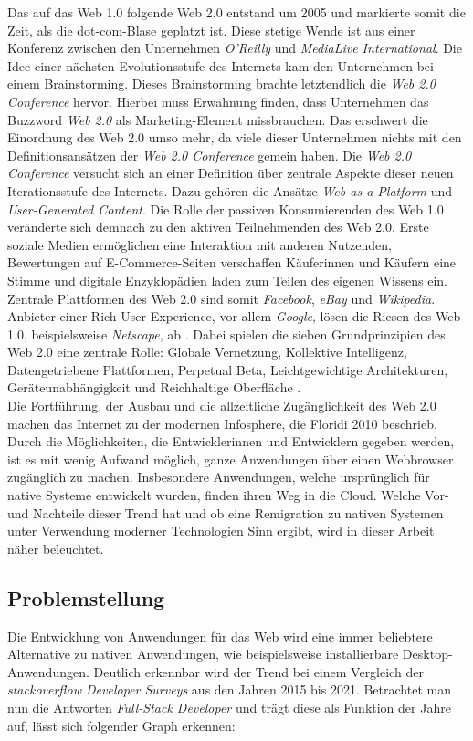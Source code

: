 \documentclass[a4paper]{scrartcl}
\begin{document}
Das auf das Web 1.0 folgende Web 2.0 entstand um 2005 und markierte somit die Zeit, als die dot-com-Blase geplatzt ist. Diese stetige Wende ist aus einer Konferenz zwischen den Unternehmen \textit{O'Reilly} und \textit{MediaLive International}. Die Idee einer nächsten Evolutionsstufe des Internets kam den Unternehmen bei einem Brainstorming. Dieses Brainstorming brachte letztendlich die \textit{Web 2.0 Conference} hervor. Hierbei muss Erwähnung finden, dass Unternehmen das Buzzword \textit{Web 2.0} als Marketing-Element missbrauchen. Das erschwert die Einordnung des Web 2.0 umso mehr, da viele dieser Unternehmen nichts mit den Definitionsansätzen der \textit{Web 2.0 Conference} gemein haben. Die \textit{Web 2.0 Conference} versucht sich an einer Definition über zentrale Aspekte dieser neuen Iterationsstufe des Internets. Dazu gehören die Ansätze \textit{Web as a Platform} und \textit{User-Generated Content}. Die Rolle der passiven Konsumierenden des Web 1.0 veränderte sich demnach zu den aktiven Teilnehmenden des Web 2.0. Erste soziale Medien ermöglichen eine Interaktion mit anderen Nutzenden, Bewertungen auf E-Commerce-Seiten verschaffen Käuferinnen und Käufern eine Stimme und digitale Enzyklopädien laden zum Teilen des eigenen Wissens ein. Zentrale Plattformen des Web 2.0 sind somit \textit{Facebook}, \textit{eBay} und \textit{Wikipedia}. Anbieter einer Rich User Experience, vor allem \textit{Google}, lösen die Riesen des Web 1.0, beispielsweise \textit{Netscape}, ab \autocite{Oreilly}. Dabei spielen die sieben Grundprinzipien des Web 2.0 eine zentrale Rolle: Globale Vernetzung, Kollektive Intelligenz, Datengetriebene Plattformen, Perpetual Beta, Leichtgewichtige Architekturen, Geräteunabhängigkeit und Reichhaltige Oberfläche \autocite[Kollmann und Häsel 2007, zitiert nach][137]{Kollmann}. \\

Die Fortführung, der Ausbau und die allzeitliche Zugänglichkeit des Web 2.0 machen das Internet zu der modernen Infosphere, die Floridi 2010 beschrieb. Durch die Möglichkeiten, die Entwicklerinnen und Entwicklern gegeben werden, ist es mit wenig Aufwand möglich, ganze Anwendungen über einen Webbrowser zugänglich zu machen. Insbesondere Anwendungen, welche ursprünglich für native Systeme entwickelt wurden, finden ihren Weg in die Cloud. Welche Vor- und Nachteile dieser Trend hat und ob eine Remigration zu nativen Systemen unter Verwendung moderner Technologien Sinn ergibt, wird in dieser Arbeit näher beleuchtet. 

\subsection{Problemstellung}
Die Entwicklung von Anwendungen für das Web wird eine immer beliebtere Alternative zu nativen Anwendungen, wie beispielsweise installierbare Desktop-Anwendungen. Deutlich erkennbar wird der Trend bei einem Vergleich der \textit{stackoverflow Developer Surveys} aus den Jahren 2015 bis 2021. Betrachtet man nun die Antworten \textit{Full-Stack Developer} und trägt diese als Funktion der Jahre auf, lässt sich folgender Graph erkennen: 
\end{document}
